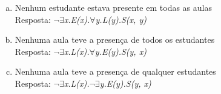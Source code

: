 \documentclass[aspectratio=43]{beamer}
\newcommand{\fall}{$\forall$}
\newcommand{\ex}{$\exists$}
\newcommand{\nao}{$\neg$}
\newcommand{\nex}{\nao\ex}
\begin{document}
\begin{frame}
	\begin{enumerate}[d)]
		\item Nenhum estudante estava presente em todas as aulas \\
		\pause
		Resposta: {\em \nao\ex x.E(x).\fall y.L(y).S(x, y)} \\
		\pause
		
		\item Nenhuma aula teve a presen\c ca de todos os estudantes \\
		\pause
		Resposta:  {\em \nex x.L(x).\fall y.E(y).S(y, x)}
		\pause
		
		\item Nenhuma aula teve a presen\c ca de qualquer estudantes \\
		\pause
		Resposta:  {\em \nex x.L(x).\nex y.E(y).S(y, x)}
	\end{enumerate}
\end{frame}
	
\end{document}
